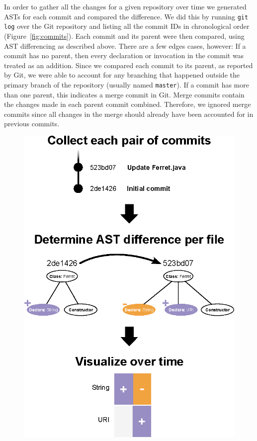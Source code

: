 \documentclass[conference]{IEEEtran}
\begin{document}
In order to gather all the changes for a given repository over time we generated ASTs for each commit and compared the difference. We did this by running \texttt{git log} over the Git repository and listing all the commit IDs in chronological order (Figure~\ref{fig:commits}). Each commit and its parent were then compared, using AST differencing as described above. There are a few edges cases, however: If a commit has no parent, then every declaration or invocation in the commit was treated as an addition. Since we compared each commit to its parent, as reported by Git, we were able to account for any branching that happened outside the primary branch of the repository (usually named \texttt{master}). If a commit has more than one parent, this indicates a merge commit in Git. Merge commits contain the changes made in each parent commit combined. Therefore, we ignored merge commits since all changes in the merge should already have been accounted for in previous commits.

\begin{figure}[!h]
\centering
\includegraphics[width=\columnwidth]{context}
\caption{}
\label{fig:context}
\end{figure}
\end{document}
